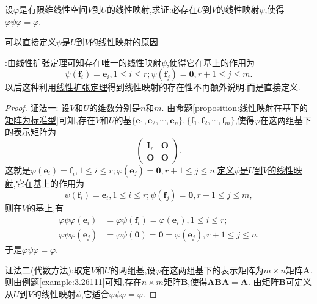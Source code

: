 \documentclass[../../main.tex]{subfiles}%
\begin{document}
\begin{example}
设\(\varphi\)是有限维线性空间\(V\)到\(U\)的线性映射,求证:必存在\(U\)到\(V\)的线性映射\(\psi\),使得\(\varphi\psi\varphi=\varphi\).
\end{example}
\begin{note}
\hypertarget{可以定义线性映射的原因}{可以直接定义\(\psi\)是\(U\)到\(V\)的线性映射的原因}:由\hyperref[theorem:线性扩张定理]{线性扩张定理}可知存在唯一的线性映射\(\psi\),使得它在基上的作用为
\[
\psi(\boldsymbol{f}_i)=\boldsymbol{e}_i,1\leqslant  i\leqslant  r;\psi(\boldsymbol{f}_j)=\boldsymbol{0},r + 1\leqslant  j\leqslant  m.
\]
以后这种利用\hyperref[theorem:线性扩张定理]{线性扩张定理}得到线性映射的存在性不再额外说明,而是直接定义.
\end{note}
\begin{proof}

{\color{blue}证法一:}
设\(V\)和\(U\)的维数分别是\(n\)和\(m\). 由\hyperref[proposition:线性映射在基下的矩阵为标准型]{命题\ref{proposition:线性映射在基下的矩阵为标准型}}可知,存在\(V\)和\(U\)的基\(\{\boldsymbol{e}_1,\boldsymbol{e}_2,\cdots,\boldsymbol{e}_n\},\{\boldsymbol{f}_1,\boldsymbol{f}_2,\cdots,\boldsymbol{f}_m\}\),使得\(\varphi\)在这两组基下的表示矩阵为
\[
\begin{pmatrix}
\boldsymbol{I}_r&\boldsymbol{O}\\
\boldsymbol{O}&\boldsymbol{O}
\end{pmatrix}.
\]
这就是\(\varphi(\boldsymbol{e}_i)=\boldsymbol{f}_i,1\leqslant  i\leqslant  r;\varphi(\boldsymbol{e}_j)=\boldsymbol{0},r + 1\leqslant  j\leqslant  n\).\hyperlink{可以定义线性映射的原因}{定义\(\psi\)是\(U\)到\(V\)的线性映射},它在基上的作用为
\[
\psi(\boldsymbol{f}_i)=\boldsymbol{e}_i,1\leqslant  i\leqslant  r;\psi(\boldsymbol{f}_j)=\boldsymbol{0},r + 1\leqslant  j\leqslant  m,
\]
则在\(V\)的基上,有
\begin{align*}
\varphi\psi\varphi(\boldsymbol{e}_i)&=\varphi\psi(\boldsymbol{f}_i)=\varphi(\boldsymbol{e}_i),1\leqslant  i\leqslant  r;\\
\varphi\psi\varphi(\boldsymbol{e}_j)&=\varphi\psi(\boldsymbol{0})=\boldsymbol{0}=\varphi(\boldsymbol{e}_j),r + 1\leqslant  j\leqslant  n.
\end{align*}
于是\(\varphi\psi\varphi=\varphi\).

{\color{blue}证法二(代数方法):}取定\(V\)和\(U\)的两组基,设\(\varphi\)在这两组基下的表示矩阵为\(m\times n\)矩阵\(\boldsymbol{A}\),则由\hyperref[example:3.26111]{例题\ref{example:3.26111}}可知,存在\(n\times m\)矩阵\(\boldsymbol{B}\),使得\(\boldsymbol{A}\boldsymbol{B}\boldsymbol{A}=\boldsymbol{A}\). 由矩阵\(\boldsymbol{B}\)可定义从\(U\)到\(V\)的线性映射\(\psi\),它适合\(\varphi\psi\varphi=\varphi\).
\end{proof}
\end{document}
